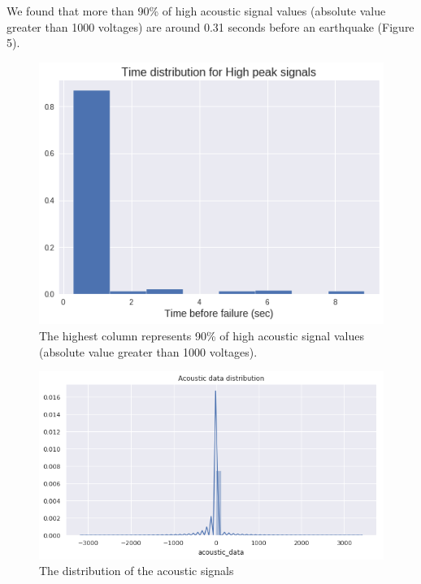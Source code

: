 \documentclass[]{llncs} %
\begin{document}
We found that more than 90\% of high acoustic signal values (absolute value greater than 1000 voltages) are around 0.31 seconds before an earthquake (Figure 5). \par
\begin{figure}
	\centering
	\includegraphics[width=.8\linewidth]{timeDistribution}
	\caption{The highest column represents 90\% of high acoustic signal values (absolute value greater than 1000 voltages).}
	\label{fig:timeDistribution}
\end{figure}

\begin{figure}
	\centering
	\includegraphics[width=.9\linewidth]{acousticDataDistribution}
	\caption{The distribution of the acoustic signals}
	\label{fig:acousticDataDistribution}
\end{figure}
\end{document}
